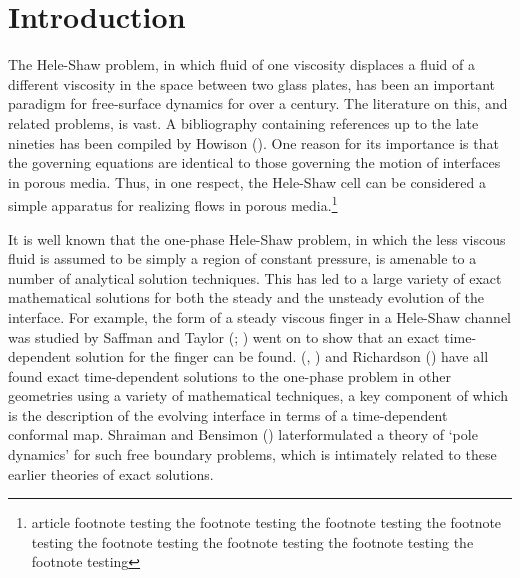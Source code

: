 \documentclass{article}
\begin{document}
\section{Introduction}
The Hele-Shaw problem, in which fluid of one viscosity displaces
a fluid of a different viscosity in the space between two glass
plates, has been an important paradigm for free-surface dynamics
for over a century. The literature on this, and related problems,
is vast. A bibliography containing references up to the late nineties
has been compiled by Howison (\citealt{How2}).
One reason for its importance is that the governing equations
are identical to those governing the motion of interfaces in
porous media. Thus,  in one respect, the Hele-Shaw cell can be considered
a simple apparatus for realizing flows in porous media.\footnote{article
footnote testing the footnote testing the footnote testing the footnote testing  the footnote testing the footnote testing  the footnote testing the footnote testing}

It is well known  that the one-phase Hele-Shaw problem, in which
the less viscous fluid is assumed to be simply a region of
constant pressure, is amenable to a number of analytical solution techniques.
This has led to a large variety of exact mathematical
solutions for both the steady and the unsteady evolution of
the interface. For example, the form of a steady viscous
finger in a Hele-Shaw channel was studied by
Saffman and  Taylor (\citealt{ST}; \citealt{PGS2}) went on to show that an
exact time-dependent solution for the finger can be found.
(\citealt{Galin}, \citealt{PK})
and Richardson (\citealt{Rich}) have all found exact time-dependent
solutions to the one-phase problem in other geometries using 
a variety of mathematical techniques, a key component of
which is the description of the evolving interface
in terms of a time-dependent conformal map.
Shraiman and Bensimon (\citealt{BS}) later\break formulated
a theory of `pole dynamics' for such free
boundary problems, which is intimately related
to these earlier theories of exact solutions.
\end{document}
